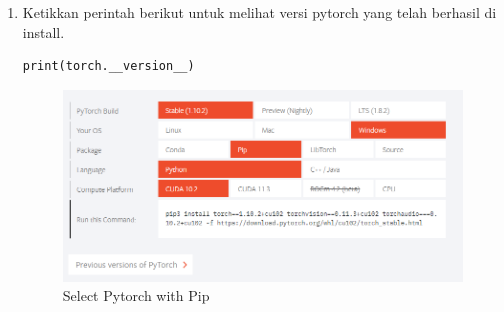 \begin{enumerate}
\item Ketikkan perintah berikut untuk melihat versi pytorch yang telah berhasil di install.
\begin{verbatim}
print(torch.__version__)
\end{verbatim}
\begin{figure}[H]
\centering
\includegraphics[scale=.35]{figures/pytorch2}
\caption{Select Pytorch with Pip}
\label{pytorch2}
\end{figure}

\end{enumerate}


